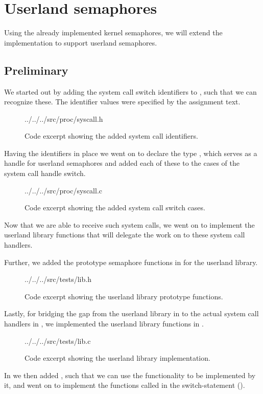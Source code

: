 %
%
%

\section{Userland semaphores}
Using the already implemented kernel semaphores, we will extend the
implementation to support userland semaphores.

\subsection{Preliminary}
We started out by adding the system call switch identifiers to
, such that we can recognize these. The identifier values
were specified by the assignment text.
\begin{figure}[H]
    
    {../../../src/proc/syscall.h}
    \label{code:syscall-identifiers}
    \caption{Code excerpt showing the added system call identifiers.}
\end{figure}
Having the identifiers in place we went on to declare the 
type , which serves as a handle for userland
semaphores and added each of these to the cases of the system call handle
switch.
\begin{figure}[H]
    
    {../../../src/proc/syscall.c}
    \label{code:syscall-switch}
    \caption{Code excerpt showing the added system call switch cases.}
\end{figure}
Now that we are able to receive such system calls, we went on to implement the
userland library functions that will delegate the work on to these system
call handlers. 

Further, we added the prototype semaphore functions in  for
the userland library.
\begin{figure}[H]
    
    {../../../src/tests/lib.h}
    \label{code:userland-library-prototypes}
    \caption{Code excerpt showing the userland library prototype functions.}
\end{figure}
Lastly, for bridging the gap from the userland library in 
to the actual system call handlers in , we implemented
the userland library functions in .
\begin{figure}[H]
    
    {../../../src/tests/lib.c}
    \label{code:userland-library-implementation}
    \caption{Code excerpt showing the userland library implementation.}
\end{figure}
In  we then added ,
such that we can use the functionality to be implemented by it, and went on to
implement the functions called in the switch-statement
().

